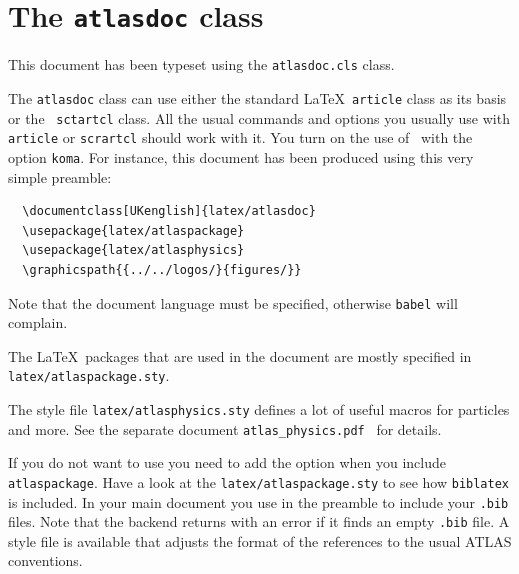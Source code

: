 \section{The \texttt{atlasdoc} class}
\label{app:atlasdoc}

This document has been typeset using the \texttt{atlasdoc.cls} class.

The \texttt{atlasdoc} class can use either the standard \LaTeX\ \texttt{article} class
as its basis or the \KOMAScript\ \texttt{sctartcl} class.
All the usual commands and options you usually use
with \texttt{article}  or \texttt{scrartcl} should work with it. 
You turn on the use of \KOMAScript\ with the option \texttt{koma}.
For instance, this document has
been produced using this very simple preamble:
%
\begin{verbatim}
  \documentclass[UKenglish]{latex/atlasdoc}
  \usepackage{latex/atlaspackage}
  \usepackage{latex/atlasphysics}
  \graphicspath{{../../logos/}{figures/}}
\end{verbatim}
%
Note that the document language must be specified, otherwise \texttt{babel} will complain.

The \LaTeX\ packages that are used in the document are mostly specified in 
\texttt{latex/atlaspackage.sty}.

The style file \texttt{latex/atlasphysics.sty} defines a lot of useful
macros for particles and more. See the separate document
\texttt{atlas\_physics.pdf}~\cite{atlas-physics} for details.

If you do not want to use  you need to add the option  when you
include \texttt{atlaspackage}.
Have a look at the \texttt{latex/atlaspackage.sty} to see how \texttt{biblatex} is included.
In your main document you use  in the preamble to include your \texttt{.bib} files.
Note that the backend  returns with an error if it finds an empty \texttt{.bib} file.
A style file  is available that adjusts the format of the references to the usual ATLAS conventions.

